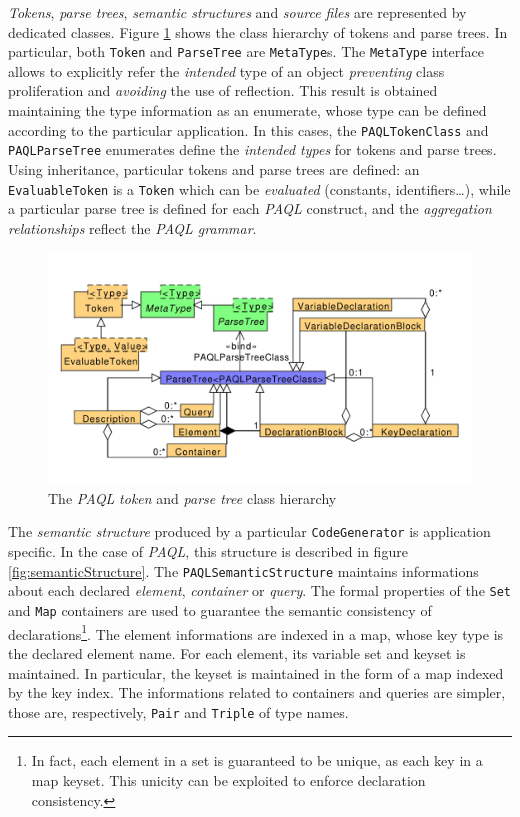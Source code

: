 \documentclass[10pt]{article}  %
\begin{document}
    \emph{Tokens}, \emph{parse trees}, \emph{semantic structures} and \emph{source files} are represented by dedicated classes.
    Figure \ref{fig:tokenandparsetree} shows the class hierarchy of tokens and parse trees. In particular, both \texttt{Token}
    and \texttt{ParseTree} are \texttt{MetaType}s. The \texttt{MetaType} interface allows to explicitly refer the \emph{intended}
    type of an object \emph{preventing} class proliferation and \emph{avoiding} the use of reflection. This result is obtained
    maintaining the type information as an enumerate, whose type can be defined according to the particular application. In this
    cases, the \texttt{PAQLTokenClass} and \texttt{PAQLParseTree} enumerates define the \emph{intended types} for tokens and parse trees.
    Using inheritance, particular tokens and parse trees are defined: an \texttt{EvaluableToken} is a \texttt{Token} which can be
    \emph{evaluated} (constants, identifiers\ldots), while a particular parse tree is defined for each \emph{PAQL} construct,
    and the \emph{aggregation relationships} reflect the \emph{PAQL grammar}.
    \begin{figure}[htbp]
        \centering
        \includegraphics[scale=0.45]{classDIagram.pdf}
        \caption{The \emph{PAQL} \emph{token} and \emph{parse tree} class hierarchy }\label{fig:tokenandparsetree}
    \end{figure}

    The \emph{semantic structure} produced by a particular \texttt{CodeGenerator} is application specific. In the case of \emph{PAQL},
    this structure is described in figure \ref{fig:semanticStructure}.
    The \texttt{PAQLSemanticStructure} maintains informations about each declared \emph{element}, \emph{container} or \emph{query}.
    The formal properties of the \texttt{Set} and \texttt{Map} containers are used to guarantee the semantic consistency of declarations\footnote
    {In fact, each element in a set is guaranteed to be unique, as each key in a map keyset. This unicity can be exploited to enforce declaration consistency.}.
    The element informations are indexed in a map, whose key type is the declared element name.
    For each element, its variable set and keyset is maintained. In particular, the keyset is maintained in the form of a map indexed by the key index.
    The informations related to containers and queries are simpler, those are, respectively, \texttt{Pair} and \texttt{Triple} of type names.
\end{document}
